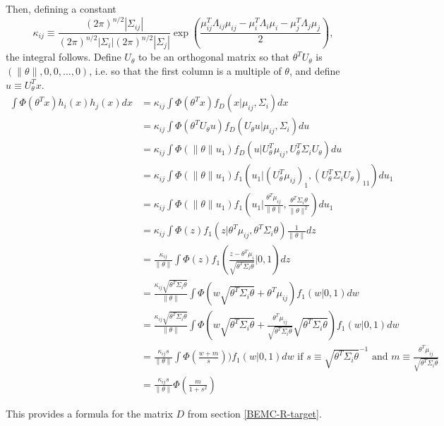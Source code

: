 \documentclass{article}
\begin{document}
Then, defining a constant 
$$
\kappa_{ij} \equiv \frac{(2\pi)^{n/2}|\Sigma_{ij}|}{(2\pi)^{n/2}|\Sigma_i|(2\pi)^{n/2}|\Sigma_j|}
\exp(\frac{
	\mu_{ij}^T\Lambda_{ij}\mu_{ij}
	-\mu_i^T\Lambda_i\mu_i-\mu_j^T\Lambda_j\mu_j
}{2})
,$$
 the integral follows. Define $U_{\theta}$ to be an orthogonal matrix so that $\theta^T U_{\theta}$ is $(\|\theta\|, 0, 0, ...,0 )$, i.e. so that the first column is a multiple of $\theta$, and define $u \equiv U_{\theta}^Tx$. 
\begin{align*}
\int \Phi(\theta ^T x)h_i(x)h_j(x)dx 
&=\kappa_{ij} 
\int \Phi(\theta ^T x)  f_D(x|\mu_{ij}, \Sigma_{i})dx\\
&=\kappa_{ij} 
\int \Phi(\theta ^T U_{\theta}u) f_D(U_{\theta}u|\mu_{ij}, \Sigma_{i})du\\
&=\kappa_{ij} 
\int \Phi(\|\theta\|u_1) f_D(u|U_{\theta}^T\mu_{ij}, U_{\theta}^T\Sigma_{i}U_{\theta})du\\
&=\kappa_{ij} 
\int \Phi(\|\theta\|u_1) f_1(u_1|(U_{\theta}^T\mu_{ij})_1, (U_{\theta}^T\Sigma_{i}U_{\theta})_{11})du_1\\
&=\kappa_{ij} 
 \int \Phi(\|\theta\|u_1) f_1(u_1|\frac{\theta^T\mu_{ij}}{\|\theta\|}, \frac{\theta^T\Sigma_{i}\theta}{\|\theta\|^2})du_1\\
&=\kappa_{ij} 
\int \Phi(z) f_1(z|{\theta^T\mu_{ij}}, {\theta^T\Sigma_{i}\theta})\frac{1}{\|\theta\|}dz\\
&=
\frac{\kappa_{ij} }{\|\theta\|}\int \Phi(z) f_1(\frac{z - \theta^T\mu_i}{\sqrt{\theta^T\Sigma_{i}\theta}}|0,1)dz\\
&=
\frac{\kappa_{ij} \sqrt{\theta^T\Sigma_{i}\theta}}{\|\theta\|}\int  \Phi(w\sqrt{\theta^T\Sigma_{i}\theta}+  \theta^T\mu_{ij})f_1(w|0,1)dw\\
&=
\frac{\kappa_{ij} \sqrt{\theta^T\Sigma_{i}\theta} }{\|\theta\|}\int  \Phi(
	w\sqrt{\theta^T\Sigma_{i}\theta}+  		
	\frac{\theta^T\mu_{ij}}		
	{\sqrt{\theta^T\Sigma_{i}\theta}}
	\sqrt{\theta^T\Sigma_{i}\theta}
)f_1(w|0,1)dw\\
&=
\frac{\kappa_{ij} s}{\|\theta\|}\int  \Phi(\frac{w+m}{s})
)f_1(w|0,1)dw \text{ if $s\equiv	\sqrt{\theta^T\Sigma_{i}\theta}^{-1}$ and $m\equiv 	\frac{\theta^T\mu_{ij}}		
 {\sqrt{\theta^T\Sigma_{i}\theta}}$}\\
&=
\frac{\kappa_{ij} s }{\|\theta\|}  \Phi(\frac{m}{1+s^2})
\end{align*}

This provides a formula for the matrix $D$ from section \ref{BEMC-R-target}.

\end{document}
